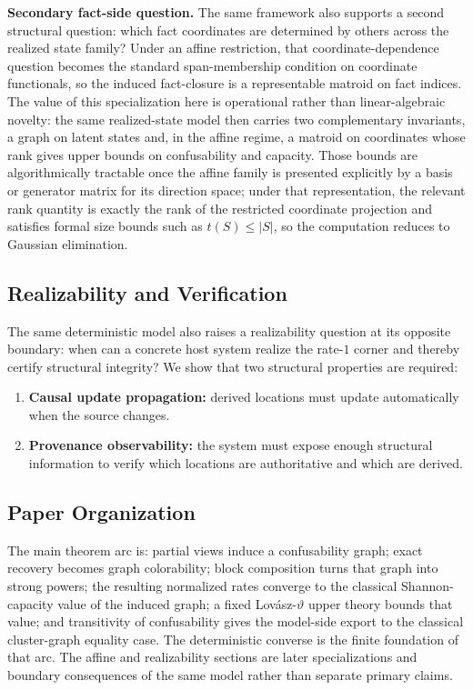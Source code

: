 \noindent\textbf{Secondary fact-side question.} The same framework also supports a second structural question: which fact coordinates are determined by others across the realized state family? Under an affine restriction, that coordinate-dependence question becomes the standard span-membership condition on coordinate functionals, so the induced fact-closure is a representable matroid on fact indices. The value of this specialization here is operational rather than linear-algebraic novelty: the same realized-state model then carries two complementary invariants, a graph on latent states and, in the affine regime, a matroid on coordinates whose rank gives upper bounds on confusability and capacity. Those bounds are algorithmically tractable once the affine family is presented explicitly by a basis or generator matrix for its direction space; under that representation, the relevant rank quantity is exactly the rank of the restricted coordinate projection and satisfies formal size bounds such as $t(S)\le |S|$, so the computation reduces to Gaussian elimination.

\subsection{Realizability and Verification}\label{sec:realizability}

The same deterministic model also raises a realizability question at its opposite boundary: when can a concrete host system realize the rate-$1$ corner and thereby certify structural integrity? We show that two structural properties are required:
\begin{enumerate}
\item \textbf{Causal update propagation:} derived locations must update automatically when the source changes.
\item \textbf{Provenance observability:} the system must expose enough structural information to verify which locations are authoritative and which are derived.
\end{enumerate}

\subsection{Paper Organization}\label{overview}

The main theorem arc is: partial views induce a confusability graph; exact recovery becomes graph colorability; block composition turns that graph into strong powers; the resulting normalized rates converge to the classical Shannon-capacity value of the induced graph; a fixed Lov\'asz-$\vartheta$ upper theory bounds that value; and transitivity of confusability gives the model-side export to the classical cluster-graph equality case. The deterministic converse is the finite foundation of that arc. The affine and realizability sections are later specializations and boundary consequences of the same model rather than separate primary claims.

